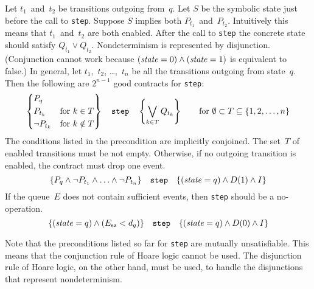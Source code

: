\documentclass{article} %
\begin{document}
Let $t_1$~and~$t_2$ be transitions outgoing from~$q$.
Let $S$ be the symbolic state just before the call to {\tt step}.
Suppose $S$ implies both $P_{t_1}$~and~$P_{t_2}$.
Intuitively this means that $t_1$~and~$t_2$ are both enabled.
After the call to {\tt step} the concrete state should satisfy $Q_{t_1}\lor Q_{t_2}$.
Nondeterminism is represented by disjunction.
(Conjunction cannot work because $({\it state}=0)\land({\it state}=1)$ is equivalent to false.)
In general, let $t_1$,~$t_2$, \dots,~$t_n$ be all the transitions outgoing from state~$q$.
Then the following are $2^{n-1}$ good contracts for {\tt step}:
\[
  \left\{\begin{aligned}
  &P_q&&\\
  &P_{t_k}  &&\text{for $k\in T$} \\
  &\lnot P_{t_k}  &&\text{for $k\notin T$}
  \end{aligned}\right\}
  \quad\text{\tt step}\quad
  \left\{\bigvee_{k\in T}Q_{t_k}\right\}
  \qquad\text{for $\emptyset\subset T\subseteq \{1,2,\ldots,n\}$}
\]
The conditions listed in the precondition are implicitly conjoined.
The set~$T$ of enabled transitions must be not empty.
Otherwise, if no outgoing transition is enabled, the contract must drop one event.
\[
  \{P_q\land\lnot P_{t_1}\land\ldots\land\lnot P_{t_n}\}
  \quad\text{\tt step}\quad
  \{({\it state}=q)\land D(1)\land I\}
\]
If the queue~$E$ does not contain sufficient events, then {\tt step} should be a no-operation.
\[
  \{({\it state}=q)\land(E_{\rm sz}<d_q)\}
  \quad\text{\tt step}\quad
  \{({\it state}=q)\land D(0)\land I\}
\]

Note that the preconditions listed so far for {\tt step} are mutually unsatisfiable.
This means that the conjunction rule of Hoare logic cannot be used.
The disjunction rule of Hoare logic, on the other hand, must be used, to handle the disjunctions that represent nondeterminism.
\end{document}
